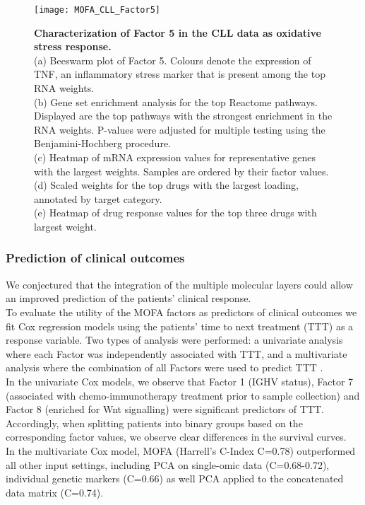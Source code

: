 \begin{figure}[H]
	\centering 	
	\texttt{[image: MOFA\_CLL\_Factor5]}
	\caption{
	\textbf{Characterization of Factor 5 in the CLL data as oxidative stress response.}\\
	(a) Beeswarm plot of Factor 5. Colours denote the expression of TNF, an inflammatory stress marker that is present among the top RNA weights.\\
	(b) Gene set enrichment analysis for the top Reactome pathways. Displayed are the top pathways with the strongest enrichment in the RNA weights. P-values were adjusted for multiple testing using the Benjamini-Hochberg procedure.\\
	(c) Heatmap of mRNA expression values for representative genes with the largest weights. Samples are ordered by their factor values.\\
	(d) Scaled weights for the top drugs with the largest loading, annotated by target category.\\
	(e) Heatmap of drug response values for the top three drugs with largest weight.
	}
	\label{fig:MOFA_CLL_Factor5}
\end{figure}


\subsubsection{Prediction of clinical outcomes}

We conjectured that the integration of the multiple molecular layers could allow an improved prediction of the patients' clinical response.\\
To evaluate the utility of the MOFA factors as predictors of clinical outcomes we fit Cox regression models \cite{Cox1972} using the patients' time to next treatment (TTT) as a response variable. Two types of analysis were performed: a univariate analysis where each Factor was independently associated with TTT, and a multivariate analysis where the combination of all Factors were used to predict TTT .\\
In the univariate Cox models, we observe  that Factor 1 (IGHV status), Factor 7 (associated with chemo-immunotherapy treatment prior to sample collection) and Factor 8 (enriched for Wnt signalling) were significant predictors of TTT. Accordingly, when splitting patients into binary groups based on the corresponding factor values, we observe clear differences in the survival curves.\\
In the multivariate Cox model, MOFA (Harrell's C-Index C=0.78) outperformed all other input settings, including PCA on single-omic data (C=0.68-0.72), individual genetic markers (C=0.66) as well PCA applied to the concatenated data matrix (C=0.74).

